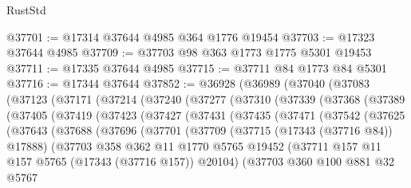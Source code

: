 \begin{lexlean}{RustStd}
\begin{coremodule}
@37701 := @17314 @37644 @4985 @364 @1776 @19454
@37703 := @17323 @37644 @4985
@37709 := @37703 @98 @363 @1773 @1775 @5301 @19453
@37711 := @17335 @37644 @4985
@37715 := @37711 @84 @1773 @84 @5301
@37716 := @17344 @37644
@37852 := @36928
    (@36989
      (@37040
        (@37083
          (@37123
            (@37171
              (@37214
                (@37240
                  (@37277
                    (@37310
                      (@37339
                        (@37368
                          (@37389
                            (@37405
                              (@37419
                                (@37423
                                  (@37427
                                    (@37431
                                      (@37435
                                        (@37471
                                          (@37542
                                            (@37625
                                              (@37643
                                                (@37688
                                                  (@37696
                                                    (@37701
                                                      (@37709
                                                        (@37715 (@17343 (@37716 @84)) @17888)
                                                        (@37703
                                                          @358
                                                          @362
                                                          @11
                                                          @1770
                                                          @5765
                                                          @19452
                                                          (@37711
                                                            @157
                                                            @11
                                                            @157
                                                            @5765
                                                            (@17343 (@37716 @157))
                                                            @20104)
                                                          (@37703
                                                            @360
                                                            @100
                                                            @881
                                                            @32
                                                            @5767

\end{coremodule}
\end{lexlean}
